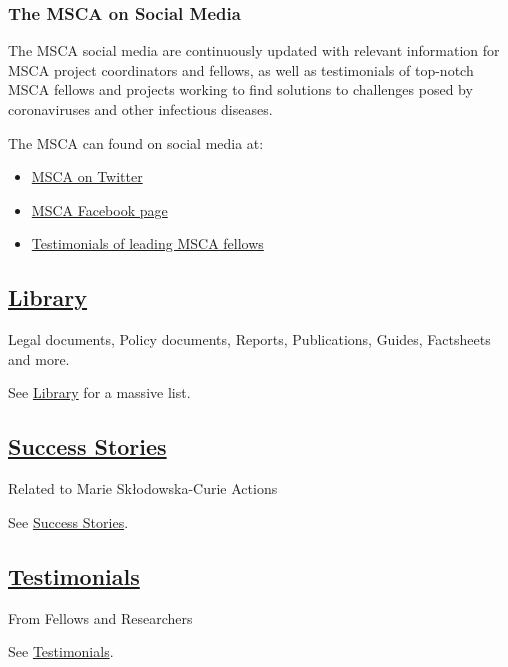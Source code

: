 \documentclass[oneside]{book}
\numberwithin{equation}{section}
\begin{document}
\subsubsection{The MSCA on Social Media}
The MSCA social media are continuously updated with relevant information for MSCA project coordinators and fellows, as well as testimonials of top-notch MSCA fellows and projects working to find solutions to challenges posed by coronaviruses and other infectious diseases.

%
The MSCA can found on social media at:
\begin{itemize}
    \item \href{https://twitter.com/MSCActions}{MSCA on Twitter}
    \item \href{https://www.facebook.com/Marie.Curie.Actions}{MSCA Facebook page}
    \item \href{https://twitter.com/i/events/1250381718831411200}{Testimonials of leading MSCA fellows}
\end{itemize}

\subsection{\href{https://ec.europa.eu/research/mariecurieactions/resources/document-library_en}{Library}}
\begin{center}
    Legal documents, Policy documents, Reports, Publications, Guides, Factsheets and more.
\end{center}
See \href{https://ec.europa.eu/research/mariecurieactions/resources/document-library_en}{Library} for a massive list.

\subsection{\href{https://ec.europa.eu/research/mariecurieactions/resources/success-stories_en}{Success Stories}}
\begin{center}
    Related to Marie Skłodowska-Curie Actions
\end{center}
See \href{https://ec.europa.eu/research/mariecurieactions/resources/success-stories_en}{Success Stories}.

\subsection{\href{https://ec.europa.eu/research/mariecurieactions/resources/testimonials_en}{Testimonials}}
\begin{center}
    From Fellows and Researchers
\end{center}
See \href{https://ec.europa.eu/research/mariecurieactions/resources/testimonials_en}{Testimonials}.
\end{document}
